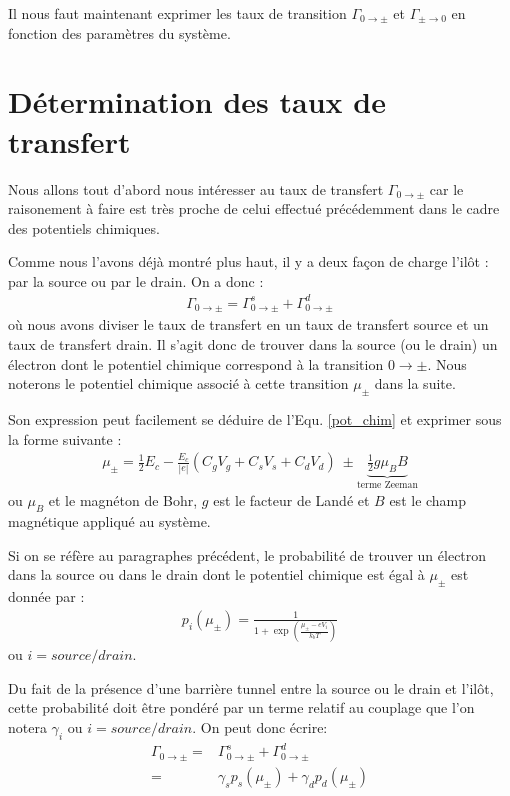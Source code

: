 Il nous faut maintenant exprimer les taux de transition $\Gamma_{0 \rightarrow \pm}$ et $\Gamma_{\pm \rightarrow 0}$ en fonction des paramètres du système. 

\section{Détermination des taux de transfert}
Nous allons tout d'abord nous intéresser au taux de transfert $\Gamma_{0 \rightarrow \pm}$ car le raisonement à faire est très proche de celui effectué précédemment dans le cadre des potentiels chimiques. 

Comme nous l'avons déjà montré plus haut, il y a deux façon de charge l'ilôt : par la source ou par le drain. On a donc :
\begin{eqnarray}
\Gamma_{0 \rightarrow \pm} = \Gamma_{0 \rightarrow \pm}^s + \Gamma_{0 \rightarrow \pm}^d
\end{eqnarray}
où nous avons diviser le taux de transfert en un taux de transfert source et un taux de transfert drain. Il s'agit donc de trouver dans la source (ou le drain) un électron dont le potentiel chimique correspond à la transition $0\rightarrow \pm$. Nous noterons le potentiel chimique associé à cette transition $\mu_{\pm}$ dans la suite. 

Son expression peut facilement se déduire de l'Equ. \ref{pot_chim} et exprimer sous la forme suivante :
\begin{eqnarray}
\mu_{\pm} = \frac{1}{2}E_c - \frac{E_c}{|e|}(C_gV_g + C_sV_s + C_dV_d)~ \pm \underbrace{ \frac{1}{2}g \mu_B B}_{\text{terme Zeeman}}
\end{eqnarray}
ou  $\mu_B$ et le magnéton de Bohr, $g$ est le facteur de Landé et $B$ est le champ magnétique appliqué au système.

Si on se réfère au paragraphes précédent, le probabilité de trouver un électron dans la source ou dans le drain dont le potentiel chimique est égal à $\mu_{\pm}$ est donnée par :
\begin{eqnarray}
p_i(\mu_\pm) = \frac{1}{1 + \exp{(\frac{\mu_\pm - eV_i}{k_bT})}}
\end{eqnarray}
ou $i=source/drain$. 

Du fait de la présence d'une barrière tunnel entre la source ou le drain et l'ilôt, cette probabilité doit être pondéré par un terme relatif au couplage que l'on notera $\gamma_i$ ou $i=source/drain$.
On peut donc écrire:
\begin{eqnarray}
\Gamma_{0 \rightarrow \pm} =& \Gamma_{0 \rightarrow \pm}^s + \Gamma_{0 \rightarrow \pm}^d  \nonumber \\
 =& \gamma_s p_s(\mu_\pm) + \gamma_d p_d(\mu_\pm)
\end{eqnarray}

